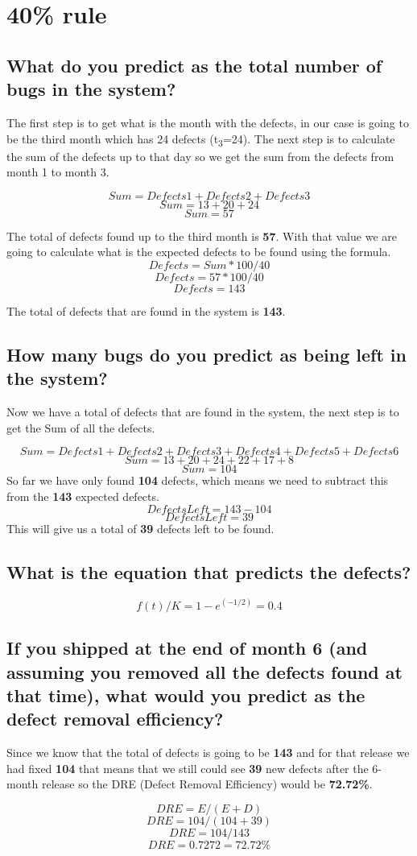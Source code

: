 \section{40\% rule}
\subsection{What do you predict as the total number of bugs in the system?}
The first step is to get what is the month with the defects, in our case is going to be the third month which has 24 defects (t\textsubscript{3}=24).\newline\newline
\noindent
The next step is to calculate the sum of the defects up to that day so we get the sum from the defects from month 1 to month 3.

\[ Sum = Defects 1 + Defects 2 + Defects 3 \]
\[ Sum = 13 + 20 + 24 \]
\[ Sum = 57 \]

\noindent
The total of defects found up to the third month is \textbf{57}. With that value we are going to calculate what is the expected defects to be found using the formula.
\[ Defects = Sum * 100 / 40 \]
\[ Defects = 57 * 100 / 40 \]
\[ Defects = 143  \]

\noindent\newline
The total of defects that are found in the system is \textbf{143}.
\pagebreak
\subsection{How many bugs do you predict as being left in the system? }
Now we have a total of defects that are found in the system, the next step is to get the Sum of all the defects.

\[ Sum = Defects 1 + Defects 2 + Defects 3 + Defects 4 + Defects 5 + Defects 6 \]
\[ Sum = 13 + 20 + 24 + 22 + 17 + 8\]
\[ Sum = 104\]
\noindent
So far we have only found \textbf{104} defects, which means we need to subtract this from the \textbf{143} expected defects.
\[ Defects Left = 143 - 104 \]
\[ Defects Left = 39 \]
\noindent
This will give us a total of \textbf{39} defects left to be found.

\subsection{What is the equation that predicts the defects?}
\[ f(t)/K = 1 - e^{(-1/2)} = 0.4\]
\subsection{If you shipped at the end of month 6 (and assuming you removed all the defects found at that time), what would you predict as the defect removal efficiency?}
Since we know that the total of defects is going to be \textbf{143} and for that release we had fixed \textbf{104} that means that we still could see \textbf{39} new defects after the 6-month release so the DRE (Defect Removal Efficiency) would be \textbf{72.72\%}.

\[ DRE = E / (E + D)\]
\[ DRE = 104 / (104 + 39) \]
\[ DRE = 104 / 143 \]
\[ DRE = 0.7272 = 72.72\%\]